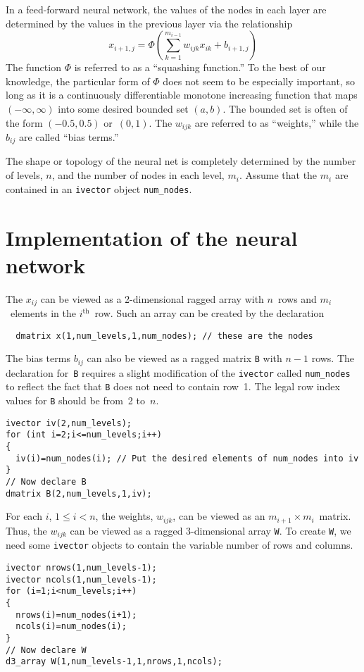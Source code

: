 \documentclass{admbmanual}
\begin{document}
In a feed-forward neural network, the values of the nodes in each
layer are determined by the values in the previous layer via the
relationship
\begin{equation}\label{eq:neural-network-01} %
  x_{i+1,j}=\Phi\left(\sum_{k=1}^{m_{i-1}}w_{ijk}x_{ik}+b_{i+1,j}\right)
\end{equation}
The function $\Phi$ is referred to as a ``squashing function.''
To the best of our knowledge, the particular
form of $\Phi$ does not seem to be especially
important, so long as it is a continuously differentiable monotone 
increasing function
that maps $(-\infty,\infty)$ into some desired bounded set $(a,b)$. 
The bounded set is often of the form $(-0.5,0.5)$ or~$(0,1)$.
The $w_{ijk}$ are referred to as ``weights,'' while the $b_{ij}$
are called ``bias terms.'' 
 

The shape or topology of the neural net is completely determined
by the number of levels, $n$, and the number of nodes in each
level, $m_i$. Assume that the $m_i$ are contained in an 
\texttt{ivector} object \texttt{num\_nodes}.


\section{Implementation of the neural network}

The $x_{ij}$ can be viewed as a 2-dimensional ragged array
with $n$~rows and $m_i$~elements in the $i^\textrm{th}$~row. Such
an array can be created by the declaration
\begin{lstlisting}
  dmatrix x(1,num_levels,1,num_nodes); // these are the nodes
\end{lstlisting}
The bias terms $b_{ij}$ can also be viewed as
a ragged matrix \texttt{B} with $n-1$ rows. The declaration for~\texttt{B}
requires a slight modification of the \texttt{ivector} called \texttt{num\_nodes}
to reflect the fact that \texttt{B} does not need to contain
row~1. The legal row index values for \texttt{B} should be from~2 to~$n$.
\begin{lstlisting}
ivector iv(2,num_levels);
for (int i=2;i<=num_levels;i++)
{
  iv(i)=num_nodes(i); // Put the desired elements of num_nodes into iv
}
// Now declare B
dmatrix B(2,num_levels,1,iv); 
\end{lstlisting}

For each $i$, $1\le i<n$, the weights, $w_{ijk}$,  can be viewed as
an $m_{i+1} \times m_i$~matrix.
Thus, the $w_{ijk}$ can be viewed as a ragged 3-dimensional array \texttt{W}.
To create \texttt{W}, we need some
\texttt{ivector} objects to contain the variable number of rows and columns.
\begin{lstlisting}
ivector nrows(1,num_levels-1);
ivector ncols(1,num_levels-1);
for (i=1;i<num_levels;i++)
{
  nrows(i)=num_nodes(i+1);
  ncols(i)=num_nodes(i);
}
// Now declare W
d3_array W(1,num_levels-1,1,nrows,1,ncols);
\end{lstlisting}
\end{document}
